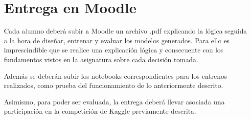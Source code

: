 \documentclass[a4paper]{article}
\begin{document}
\section{Entrega en Moodle}
Cada alumno deberá subir a Moodle un archivo .pdf explicando la lógica seguida a la hora de diseñar, entrenar y evaluar los modelos generados. Para ello es imprescindible que se realice una explicación lógica y consecuente con los fundamentos vistos en la asignatura sobre cada decisión tomada.

Además se deberán subir los notebooks correspondientes para los entrenos realizados, como prueba del funcionamiento de lo anteriormente descrito.

Asimismo, para poder ser evaluada, la entrega deberá llevar asociada una participación en la competición de Kaggle previamente descrita.
\end{document}
